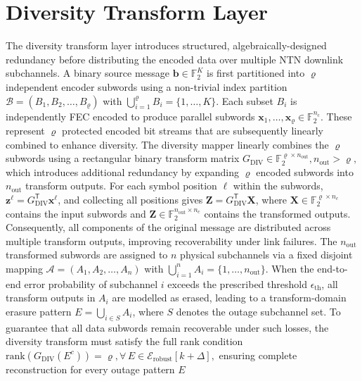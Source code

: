 \documentclass[lettersize,journal]{IEEEtran}
\begin{document}
\section{Diversity Transform Layer}
\label{sec:diversity_transform}
The diversity transform layer introduces structured, algebraically-designed redundancy before distributing the encoded data over multiple NTN downlink subchannels. A binary source message $\mathbf{b} \in \mathbb{F}_2^K$ is first 
partitioned into $\varrho$ independent encoder subwords using a 
non-trivial index partition 
$\mathcal{B} = (B_1, B_2, \ldots, B_\varrho)$ 
with $\bigcup_{i=1}^\varrho B_i = \{1,\ldots,K\}$. 
Each subset $B_i$ is independently FEC encoded to produce 
parallel subwords $\mathbf{x}_1,\ldots,\mathbf{x}_\varrho \in 
\mathbb{F}_2^{n_{\mathrm{c}}}$. These represent $\varrho$ protected 
encoded bit streams that are subsequently linearly combined to enhance diversity. The 
diversity mapper linearly combines the $\varrho$ subwords using a 
rectangular binary transform matrix $
G_{\text{DIV}} \in \mathbb{F}_{2}^{\varrho \times n_{\text{out}}}, 
 n_{\text{out}} > \varrho,$ which introduces additional redundancy by expanding $\varrho$ encoded 
subwords into $n_{\text{out}}$ transform outputs. For each symbol position $\ell$ within the subwords, 
$\mathbf{z}^{\ell} = G_{\text{DIV}}^{\mathsf{T}} \mathbf{x}^{\ell}$, 
and collecting all positions gives 
$\mathbf{Z} = G_{\text{DIV}}^{\mathsf{T}}\mathbf{X}$, 
where $\mathbf{X} \in \mathbb{F}_2^{\varrho\times n_c}$ contains the 
input subwords and $\mathbf{Z} \in \mathbb{F}_2^{n_{\text{out}}\times 
n_c}$ contains the transformed outputs. Consequently, all components 
of the original message are distributed across multiple transform 
outputs, improving recoverability under link failures. 
The $n_{\text{out}}$ transformed subwords are assigned to $n$ physical 
subchannels via a fixed disjoint mapping 
$\mathcal{A} = (A_1, A_2, \ldots, A_n)$ 
with $\bigcup_{i=1}^n A_i = \{1,\ldots,n_{\text{out}}\}$. 
When the end-to-end error probability of subchannel $i$ 
exceeds the prescribed threshold $\epsilon_{\mathrm{th}}$, 
all transform outputs in $A_i$ are modelled as erased, 
leading to a transform-domain erasure pattern 
$E = \bigcup_{i\in S} A_i$, where $S$ denotes the outage subchannel set. To guarantee that all  data subwords remain recoverable under such losses, the diversity 
transform must satisfy the full rank condition
$ \mathrm{rank}\!\left(G_{\text{DIV}}(E^{c})\right)=\varrho, 
 \forall\,E \in \mathcal{E}_{\mathrm{robust}}[k+\Delta],$
 ensuring complete reconstruction for every outage pattern $E$ 
\end{document}
